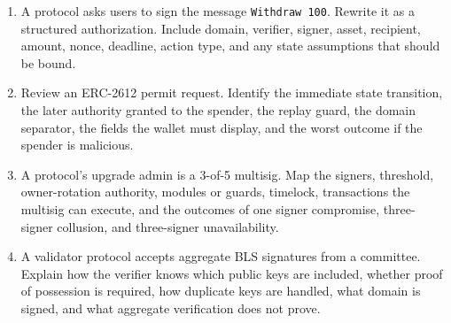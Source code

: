 \begin{enumerate}
\item A protocol asks users to sign the message \texttt{Withdraw 100}. Rewrite it as a structured authorization. Include domain, verifier, signer, asset, recipient, amount, nonce, deadline, action type, and any state assumptions that should be bound.

\item Review an ERC-2612 permit request. Identify the immediate state transition, the later authority granted to the spender, the replay guard, the domain separator, the fields the wallet must display, and the worst outcome if the spender is malicious.

\item A protocol's upgrade admin is a 3-of-5 multisig. Map the signers, threshold, owner-rotation authority, modules or guards, timelock, transactions the multisig can execute, and the outcomes of one signer compromise, three-signer collusion, and three-signer unavailability.

\item A validator protocol accepts aggregate BLS signatures from a committee. Explain how the verifier knows which public keys are included, whether proof of possession is required, how duplicate keys are handled, what domain is signed, and what aggregate verification does not prove.
\end{enumerate}
